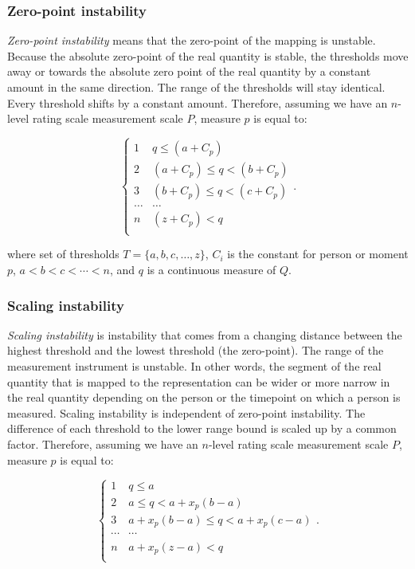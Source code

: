 \documentclass[utf8]{FrontiersinVancouver}
\begin{document}
\subsubsection{Zero-point instability}
\textit{Zero-point instability} means that the zero-point of the mapping is unstable. Because the absolute zero-point of the real quantity is stable, the thresholds move away or towards the absolute zero point of the real quantity by a constant amount in the same direction. The range of the thresholds will stay identical. Every threshold shifts by a constant amount. Therefore, assuming we have an $n$-level rating scale measurement scale $P$, measure $p$ is equal to:

\[
\begin{cases} 
    1 & q  \leq (a + C_{p})\\
    2 & (a + C_{p}) \leq q < (b + C_{p})\\
    3 & (b + C_{p})  \leq q < (c + C_{p})\\
    \ldots & \ldots\\    
    n & (z + C_{p})  < q\\
\end{cases}.
\]

where set of thresholds $T = \{a, b, c, \ldots, z\}$, $C_{i}$ is the constant for person or moment $p$, $a < b < c < \cdots < n$, and $q$ is a continuous measure of $Q$. 

\subsubsection{Scaling instability}
\textit{Scaling instability} is instability that comes from a changing distance between the highest threshold and the lowest threshold (the zero-point). The range of the measurement instrument is unstable. In other words, the segment of the real quantity that is mapped to the representation can be wider or more narrow in the real quantity depending on the person or the timepoint on which a person is measured. Scaling instability is independent of zero-point instability. The difference of each threshold to the lower range bound is scaled up by a common factor. Therefore, assuming we have an $n$-level rating scale measurement scale $P$, measure $p$ is equal to:

\[
\begin{cases} 
    1 & q \leq a\\
    2 & a \leq q < a + x_{p}(b - a)\\
    3 & a + x_{p}(b - a) \leq q < a + x_{p}(c - a)\\
    \cdots & \cdots\\    
    n & a + x_{p}(z - a) < q\\
\end{cases}.
\]
\end{document}

